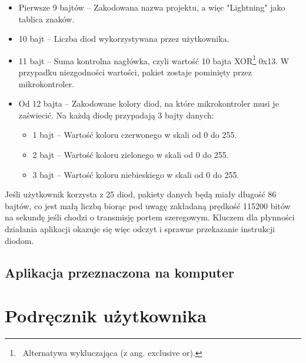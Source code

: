 \documentclass[12pt]{report}
\begin{document}
\begin{itemize}
	\item Pierwsze 9 bajtów -- Zakodowana nazwa projektu, a więc "Lightning" jako tablica znaków.
	\item 10 bajt -- Liczba diod wykorzystywana przez użytkownika.
	\item 11 bajt -- Suma kontrolna nagłówka, czyli wartość 10 bajta XOR\footnote{~Alternatywa wykluczająca (z ang. exclusive or).} 0x13. W przypadku niezgodności wartości, pakiet zostaje pominięty przez mikrokontroler.
	\item Od 12 bajta -- Zakodowane kolory diod, na które mikrokontroler musi je zaświecić. Na każdą diodę przypadają 3 bajty danych:
	\begin{itemize}
		\item 1 bajt -- Wartość koloru czerwonego w skali od 0 do 255.
		\item 2 bajt -- Wartość koloru zielonego w skali od 0 do 255.
		\item 3 bajt -- Wartość koloru niebieskiego w skali od 0 do 255.
	\end{itemize}
\end{itemize}

Jeśli użytkownik korzysta z 25 diod, pakiety danych będą miały długość 86 bajtów, co jest małą liczbą biorąc pod uwagę zakładaną prędkość 115200 bitów na sekundę jeśli chodzi o transmisję portem szeregowym. Kluczem dla płynności działania aplikacji okazuje się więc odczyt i sprawne przekazanie instrukcji diodom.













\subsection{Aplikacja przeznaczona na komputer}














\section{Podręcznik użytkownika}
\end{document}
